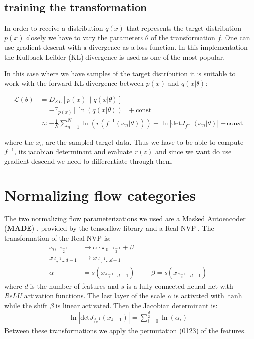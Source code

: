\documentclass[%
 reprint,
 amsmath,amssymb,
 aps,
]{revtex4-2}
\begin{document}
\subsection{training the transformation}
In order to receive a distribution $q(x)$ that represents the target distribution $p(x)$ closely we have to vary the parameters $\theta$ of the transformation $f$. One can use gradient descent with a divergence as a loss function. In this implementation the Kullback-Leibler (KL) divergence is used as one of the most popular.

In this case where we have samples of the target distribution it is suitable to work with the forward KL divergence between $p(x)$ and $q(x|\theta)$:

\begin{align*}
	\mathcal{L}(\theta) &= D_{KL}\left[p(x)\middle\|q(x|\theta)\right]\\
	&=-\mathbb{E}_{p(x)}\left[\ln(q(x|\theta))\right] + \text{const} \\
	&\approx -\frac{1}{N}\sum_{n=1}^{N}\ln(r(f^{-1}(x_n|\theta))) + \ln\left|\text{det}J_{f^{-1}}(x_n|\theta)\right| + \text{const}
\end{align*} 

where the $x_n$ are the sampled target data. Thus we have to be able to compute $f^{-1}$, its jacobian determinant and evaluate $r(z)$ and since we want do use gradient descend we need to differentiate through them. \cite{LuRi}

\section{Normalizing flow categories}
The two normalizing flow parameterizations we used are a Masked Autoencoder (\textbf{MADE}) \cite{pmlr-v37-germain15}, provided by the tensorflow library and a Real NVP \cite{JMLR:v22:19-1028}. 
The transformation of the Real NVP is: 
\begin{align*}
	x_{0...\frac{d-1}{2}} &\rightarrow \alpha \cdot x_{0...\frac{d-1}{2}} + \beta\\
	x_{\frac{d-1}{2}...d-1} &\rightarrow x_{\frac{d-1}{2}...d-1} \\
	\alpha &= s(x_{\frac{d-1}{2}...d-1}) \hspace{1cm} \beta = s(x_{\frac{d-1}{2}...d-1})
\end{align*}
where $d$ is the number of features and $s$ is a fully connected neural net with \textit{ReLU} activation functions. The last layer of the scale $\alpha$ is activated with $\tanh$ while the shift $\beta$ is linear activated.
Then the Jacobian determinant is:
\begin{align*}
	\ln\left|\text{det}J_{f_{k}^{-1}}(x_{k-1})\right| = \sum_{i=0}^{\frac{d}{2}} \ln(\alpha_i)
\end{align*}
Between these transformations we apply the permutation (0123) of the features.
\end{document}
